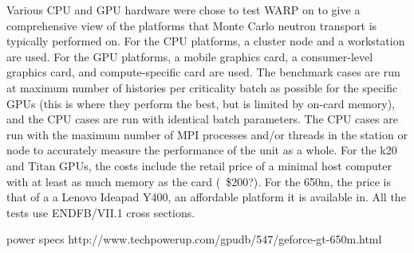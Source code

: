 \documentclass[preprint,12pt]{elsarticle}
\begin{document}
Various CPU and GPU hardware were chose to test WARP on to give a comprehensive view of the platforms that Monte Carlo neutron transport is typically performed on.  For the CPU platforms, a cluster node and a workstation are used.  For the GPU platforms, a mobile graphics card, a consumer-level graphics card, and compute-specific card are used. The benchmark cases are run at maximum number of histories per criticality batch as possible for the specific GPUs (this is where they perform the best, but is limited by on-card memory), and the CPU cases are run with identical batch parameters.  The CPU cases are run with the maximum number of MPI processes and/or threads in the station or node to accurately measure the performance of the unit as a whole. For the k20 and Titan GPUs, the costs include the retail price of a minimal host computer with at least as much memory as the card (~\$200?).  For the 650m, the price is that of a a Lenovo Ideapad Y400, an affordable platform it is available in.   All the tests use ENDFB/VII.1 cross sections.

power specs http://www.techpowerup.com/gpudb/547/geforce-gt-650m.html
\end{document}
